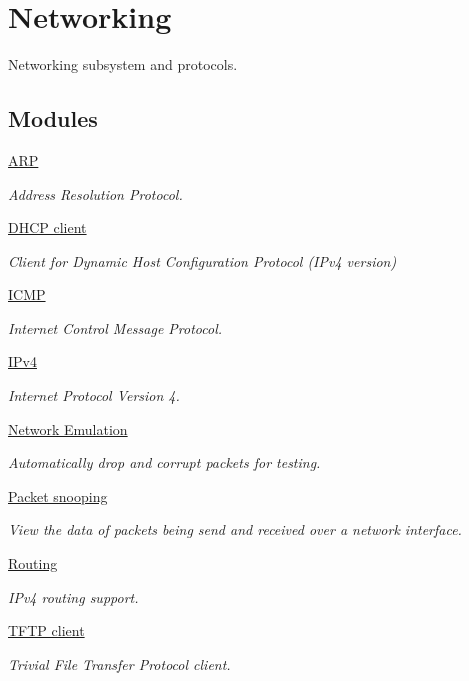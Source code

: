 \hypertarget{group__network}{\section{Networking}
\label{group__network}
}


Networking subsystem and protocols.  


\subsection*{Modules}
\begin{DoxyCompactItemize}
\item 
\hyperlink{group__arp}{A\-R\-P}
\begin{DoxyCompactList}\small\item\em Address Resolution Protocol. \end{DoxyCompactList}\item 
\hyperlink{group__dhcpc}{D\-H\-C\-P client}
\begin{DoxyCompactList}\small\item\em Client for Dynamic Host Configuration Protocol (I\-Pv4 version) \end{DoxyCompactList}\item 
\hyperlink{group__icmp}{I\-C\-M\-P}
\begin{DoxyCompactList}\small\item\em Internet Control Message Protocol. \end{DoxyCompactList}\item 
\hyperlink{group__ipv4}{I\-Pv4}
\begin{DoxyCompactList}\small\item\em Internet Protocol Version 4. \end{DoxyCompactList}\item 
\hyperlink{group__netemu}{Network Emulation}
\begin{DoxyCompactList}\small\item\em Automatically drop and corrupt packets for testing. \end{DoxyCompactList}\item 
\hyperlink{group__snoop}{Packet snooping}
\begin{DoxyCompactList}\small\item\em View the data of packets being send and received over a network interface. \end{DoxyCompactList}\item 
\hyperlink{group__route}{Routing}
\begin{DoxyCompactList}\small\item\em I\-Pv4 routing support. \end{DoxyCompactList}\item 
\hyperlink{group__tftp}{T\-F\-T\-P client}
\begin{DoxyCompactList}\small\item\em Trivial File Transfer Protocol client. \end{DoxyCompactList}\end{DoxyCompactItemize}

